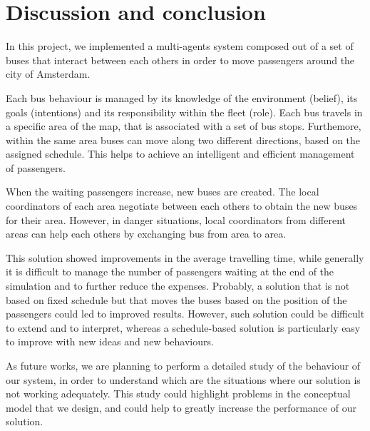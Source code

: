 \section{Discussion and conclusion}
In this project, we implemented a multi-agents system composed out of a set of buses that interact between each others in order to move passengers around the city of Amsterdam. 

Each bus behaviour is managed by its knowledge of the environment (belief), its goals (intentions) and its responsibility within the fleet (role). Each bus travels in a specific area of the map, that is associated with a set of bus stops. Furthemore, within the same area buses can move along two different directions, based on the assigned schedule. This helps to achieve an intelligent and efficient management of passengers. 

When the waiting passengers increase, new buses are created. The local coordinators of each area negotiate between each others to obtain the new buses for their area. However, in danger situations, local coordinators from different areas can help each others by exchanging bus from area to area.

This solution showed improvements in the average travelling time, while generally it is difficult to manage the number of passengers waiting at the end of the simulation and to further reduce the expenses. Probably, a solution that is not based on fixed schedule but that moves the buses based on the position of the passengers could led to improved results. However, such solution could be difficult to extend and to interpret, whereas a schedule-based solution is particularly easy to improve with new ideas and new behaviours. 

As future works, we are planning to perform a detailed study of the behaviour of our system, in order to understand which are the situations where our solution is not working adequately. This study could highlight problems in the conceptual model that we design, and could help to greatly increase the performance of our solution.
